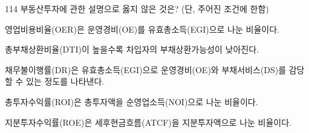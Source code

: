 \begin{question}{114}
부동산투자에 관한 설명으로 옳지 않은 것은? (단, 주어진 조건에 한함)
\begin{choices}
  \item 영업비용비율(OER)은 운영경비(OE)를 유효총소득(EGI)으로 나눈 비율이다.
  \item 총부채상환비율(DTI)이 높을수록 차입자의 부채상환가능성이 낮아진다.
  \item 채무불이행률(DR)은 유효총소득(EGI)으로 운영경비(OE)와 부채서비스(DS)를 감당할 수 있는 정도를 나타낸다.
  \item 총투자수익률(ROI)은 총투자액을 순영업소득(NOI)으로 나눈 비율이다.
  \item 지분투자수익률(ROE)은 세후현금흐름(ATCF)을 지분투자액으로 나눈 비율이다.
\end{choices}
\end{question}
